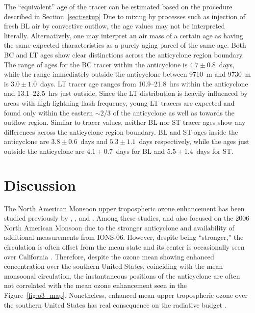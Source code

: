 The ``equivalent'' age of the tracer can be estimated based on the procedure described in Section~\ref{sect:setup}
Due to mixing by processes such as injection of fresh BL air by convective outflow,
the age values may not be interpreted literally. Alternatively, one may interpret
an air mass of a certain age as having the same expected characteristics as a
purely aging parcel of the same age. Both BC and LT ages show clear distinctions
across the anticyclone region boundary. The range of ages for the BC tracer within
the anticyclone is $4.7\pm0.8$~days, while the range immediately outside the anticyclone
between 9710~m and 9730~m is $3.0\pm1.0$~days. LT tracer age ranges from 10.9--21.8~hrs
within the anticyclone and 13.1--22.5~hrs just outside. Since the LT distribution is
heavily influenced by areas with high lightning flash frequency, young LT tracers
are expected and found  only within the eastern $\sim2/3$ of the anticyclone as
well as towards the outflow region. Similar to tracer values, neither BL nor ST tracer ages show
any differences across the anticyclone region boundary. BL and ST ages inside
the anticyclone are $3.8\pm0.6$~days and $5.3\pm1.1$~days respectively, while
the ages just outside the anticyclone are $4.1\pm0.7$~days for BL and $5.5\pm1.4$~days for ST.

\section{Discussion}\label{sect:disscusion}

The North American Monsoon upper tropospheric ozone enhancement has
been studied previously by \citet{Li:2005ss},
\citet{Cooper:2006dq,Cooper:2007cr,Cooper:2009nx}, and \citet{Barth:2012qf}.
Among these studies, \citet{Cooper:2007cr} and \citet{Barth:2012qf} also focused
on the 2006 North American Monsoon due to the stronger anticyclone
and availability of additional measurements from IONS-06. However, despite
being ``stronger,'' the circulation is often offset from the mean state and its center is
occasionally seen over California \citep{Barth:2012qf}. Therefore, despite the
ozone mean showing enhanced concentration over the southern United States, coinciding
with the mean monsoonal circulation, the instantaneous positions of the anticyclone are
often not correlated with the mean ozone enhancement seen in the Figure~\ref{fig:o3_map}.
Nonetheless, enhanced mean upper tropospheric ozone over the southern United States
has real consequence on the radiative budget \citep{Cooper:2007cr}.

